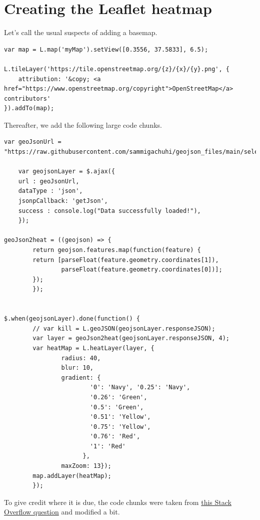 \documentclass[
]{book}
\begin{document}
\hypertarget{creating-the-leaflet-heatmap}{%
\section{Creating the Leaflet heatmap}\label{creating-the-leaflet-heatmap}}

Let's call the usual suspects of adding a basemap.

\begin{verbatim}
var map = L.map('myMap').setView([0.3556, 37.5833], 6.5);

L.tileLayer('https://tile.openstreetmap.org/{z}/{x}/{y}.png', {
    attribution: '&copy; <a href="https://www.openstreetmap.org/copyright">OpenStreetMap</a> contributors'
}).addTo(map);
\end{verbatim}

Thereafter, we add the following large code chunks.

\begin{verbatim}
var geoJsonUrl = "https://raw.githubusercontent.com/sammigachuhi/geojson_files/main/selected_hospitals.json"

    var geojsonLayer = $.ajax({
    url : geoJsonUrl,
    dataType : 'json',
    jsonpCallback: 'getJson',
    success : console.log("Data successfully loaded!"),
    });

geoJson2heat = ((geojson) => {
        return geojson.features.map(function(feature) {
        return [parseFloat(feature.geometry.coordinates[1]), 
                parseFloat(feature.geometry.coordinates[0])];
        });
        });


$.when(geojsonLayer).done(function() {
        // var kill = L.geoJSON(geojsonLayer.responseJSON);
        var layer = geoJson2heat(geojsonLayer.responseJSON, 4);
        var heatMap = L.heatLayer(layer, { 
                radius: 40,
                blur: 10, 
                gradient: {
                        '0': 'Navy', '0.25': 'Navy',
                        '0.26': 'Green',
                        '0.5': 'Green',
                        '0.51': 'Yellow',
                        '0.75': 'Yellow',
                        '0.76': 'Red',
                        '1': 'Red'
                      },
                maxZoom: 13});
        map.addLayer(heatMap);
        });
\end{verbatim}

To give credit where it is due, the code chunks were taken from \href{https://gis.stackexchange.com/questions/337294/heatmap-with-geojson-leaflet-and-leaflet-heat-plugin?utm_source=pocket_reader}{this Stack Overflow question} and modified a bit.
\end{document}
